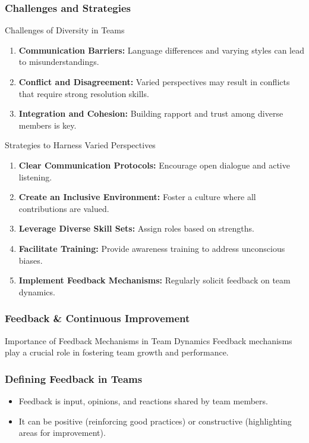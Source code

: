 \documentclass[aspectratio=169]{beamer}
\begin{document}
\begin{frame}[fragile]
    \frametitle{Challenges and Strategies}
    \begin{block}{Challenges of Diversity in Teams}
        \begin{enumerate}
            \item \textbf{Communication Barriers:} Language differences and varying styles can lead to misunderstandings.
            \item \textbf{Conflict and Disagreement:} Varied perspectives may result in conflicts that require strong resolution skills.
            \item \textbf{Integration and Cohesion:} Building rapport and trust among diverse members is key.
        \end{enumerate}
    \end{block}
    
    \begin{block}{Strategies to Harness Varied Perspectives}
        \begin{enumerate}
            \item \textbf{Clear Communication Protocols:} Encourage open dialogue and active listening.
            \item \textbf{Create an Inclusive Environment:} Foster a culture where all contributions are valued.
            \item \textbf{Leverage Diverse Skill Sets:} Assign roles based on strengths.
            \item \textbf{Facilitate Training:} Provide awareness training to address unconscious biases.
            \item \textbf{Implement Feedback Mechanisms:} Regularly solicit feedback on team dynamics.
        \end{enumerate}
    \end{block}
\end{frame}

\begin{frame}[fragile]
    \frametitle{Feedback \& Continuous Improvement}
    \begin{block}{Importance of Feedback Mechanisms in Team Dynamics}
        Feedback mechanisms play a crucial role in fostering team growth and performance. 
    \end{block}
\end{frame}

\begin{frame}[fragile]
    \frametitle{Defining Feedback in Teams}
    \begin{itemize}
        \item Feedback is input, opinions, and reactions shared by team members.
        \item It can be positive (reinforcing good practices) or constructive (highlighting areas for improvement).
    \end{itemize}
\end{frame}
\end{document}

